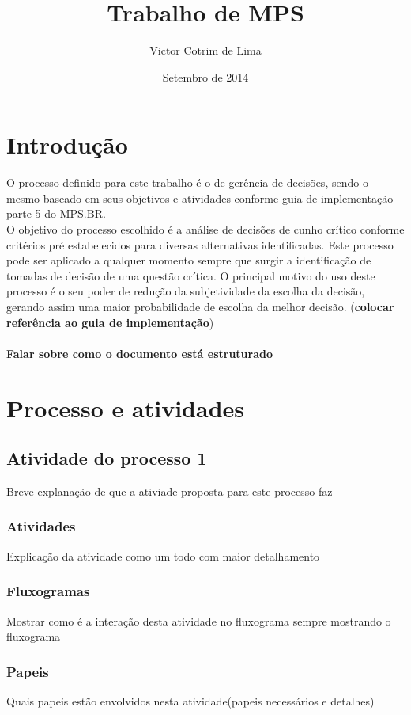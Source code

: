 \documentclass{article}
\title{Trabalho de MPS}
\author{Victor Cotrim de Lima }
\date{Setembro de 2014}
\begin{document}
\maketitle


\section{Introdução}
O processo definido para este trabalho é o de gerência de decisões, sendo o mesmo baseado em seus objetivos e atividades conforme guia de implementação parte 5 do MPS.BR.\\
O objetivo do processo escolhido é a análise de decisões de cunho crítico conforme critérios pré estabelecidos para diversas alternativas identificadas. Este processo pode ser aplicado a qualquer momento sempre que surgir a identificação de tomadas de decisão de uma questão crítica. O principal motivo do uso deste processo é o seu poder de redução da subjetividade da escolha da decisão, gerando assim uma maior probabilidade de escolha da melhor decisão. (\textbf{colocar referência ao guia de implementação})
\paragraph{Falar sobre como o documento está estruturado}

\section{Processo e atividades} 

	\subsection{Atividade do processo 1}
		Breve explanação de que a ativiade proposta para este processo faz
		
		\subsubsection{Atividades}
			Explicação da atividade como um todo com maior detalhamento
		\subsubsection{Fluxogramas}
			Mostrar como é a interação desta atividade no fluxograma sempre mostrando o fluxograma
		\subsubsection{Papeis}
			Quais papeis estão envolvidos nesta atividade(papeis necessários e detalhes)
\end{document}
